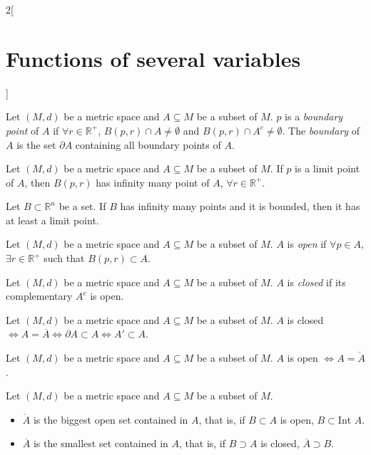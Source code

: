 \documentclass[class=article,10pt,crop=false]{standalone}
\begin{document}
\begin{multicols}{2}[\section{Functions of several variables}]
\begin{definition}
Let $(M,d)$ be a metric space and $A\subseteq M$ be a subset of $M$. $p$ is a \textit{boundary point} of $A$ if $\forall r\in\mathbb{R}^+$, $B(p,r)\cap A\ne\emptyset$ and $B(p,r)\cap A^c\ne\emptyset$. The \textit{boundary} of $A$ is the set $\partial A$ containing all boundary points of $A$.
\end{definition}
\begin{prop}
Let $(M,d)$ be a metric space and $A\subseteq M$ be a subset of $M$. If $p$ is a limit point of $A$, then $B(p,r)$ has infinity many point of $A$, $\forall r\in\mathbb{R}^+$.
\end{prop}
\begin{theorem}
Let $B\subset\mathbb{R}^n$ be a set. If $B$ has infinity many points and it is bounded, then it has at least a limit point.
\end{theorem}
\begin{definition}
Let $(M,d)$ be a metric space and $A\subseteq M$ be a subset of $M$. $A$ is \textit{open} if $\forall p\in A$, $\exists r\in\mathbb{R}^+$ such that $B(p,r)\subset A$.
\end{definition}
\begin{definition}
Let $(M,d)$ be a metric space and $A\subseteq M$ be a subset of $M$. $A$ is \textit{closed} if its complementary $A^c$ is open.
\end{definition}
\begin{prop} 
Let $(M,d)$ be a metric space and $A\subseteq M$ be a subset of $M$. $A$ is closed $\iff A=\overline{A}\iff\partial A\subset A\iff A'\subset A$.
\end{prop}
\begin{prop}
Let $(M,d)$ be a metric space and $A\subseteq M$ be a subset of $M$. $A$ is open $\iff A=\mathring A$.
\end{prop}
\begin{prop}
Let $(M,d)$ be a metric space and $A\subseteq M$ be a subset of $M$.
\begin{itemize}
    \item $\mathring A$ is the biggest open set contained in $A$, that is, if $B\subset A$ is open, $B\subset\text{Int }A$.
    \item $\overline{A}$ is the smallest set contained in $A$, that is, if $B\supset A$ is closed, $\overline{A}\supset B$.
\end{itemize}
\end{prop}
\begin{prop}

\end{prop}
\end{multicols}
\end{document}

